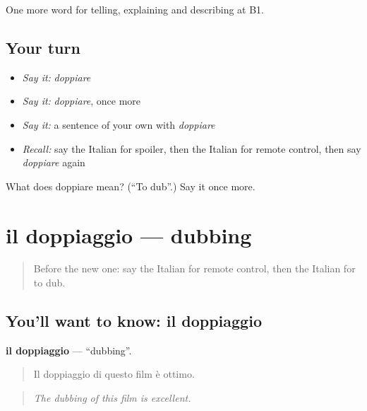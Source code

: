 \begin{grammarlens}[title={What you've built}]
One more word for telling, explaining and describing at B1.
\end{grammarlens}

\subsection*{Your turn}
\begin{itemize}
\raggedright
  \item \emph{Say it:} \emph{doppiare}
  \item \emph{Say it:} \emph{doppiare}, once more
  \item \emph{Say it:} a sentence of your own with \emph{doppiare}
  \item \emph{Recall:} say the Italian for spoiler, then the Italian for remote control, then say \emph{doppiare} again
\end{itemize}

\begin{tcolorbox}[breakable,colback=teal!4,colframe=teal!35!black,title={Before you move on}]
What does doppiare mean? (\textquotedblleft{}To dub\textquotedblright{}.) Say it once more.
\end{tcolorbox}
\section[il doppiaggio]{il doppiaggio — dubbing}

\label{lesson:IT-C529-doppiaggio}



\begin{quote}
Before the new one: say the Italian for remote control, then the Italian for to dub.
\end{quote}

\subsection*{You'll want to know: il doppiaggio}
\textbf{il doppiaggio} — \textquotedblleft{}dubbing\textquotedblright{}.

\begin{quote}
Il doppiaggio di questo film è ottimo.
\end{quote}

\begin{quote}
\emph{The dubbing of this film is excellent.}
\end{quote}

